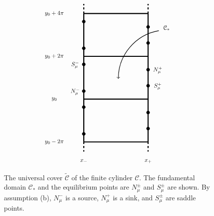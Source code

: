 \documentclass[11 pt]{article}
\renewcommand\({\left(}
\renewcommand\){\right)}
\newcommand\wt{\widetilde}
\newcommand\<{\langle}
\renewcommand\>{\rangle}
\newcommand\8{\infty}
\newcommand{\mc}{\mathcal}
\begin{document}
\begin{figure}[h]
\[
\begin{tikzpicture}[scale = 0.55]

\draw[ultra thick] (-3,-6) -- (-3, 6);
\draw[ultra thick] (3,-6) -- (3,6);

\draw[ultra thick, dashed] (-3,6) -- (-3,6.9);
\draw[ultra thick, dashed] (3,6) -- (3,6.9);
\draw[ultra thick, dashed] (-3,-6) -- (-3,-6.9);
\draw[ultra thick, dashed] (3,-6) -- (3,-6.9);

\draw[ultra thick] (-3,-2) -- (3,-2);
\draw[ultra thick] (-3,2) -- (3,2);
\draw[ultra thick] (-3,-6) -- (3,-6);
\draw[ultra thick] (-3,6) -- (3,6);


\node [scale = .50] [circle, draw, fill = black] at (-3,-1.25)  {};
\node [scale = .50] [circle, draw, fill = black] at (-3,1.25)  {};
\node [scale = .50] [circle, draw, fill = black] at (3,-.75)  {};
\node [scale = .50] [circle, draw, fill = black] at (3,.75)  {};

\node [scale = .50] [circle, draw, fill = black] at (-3,-5.25)  {};
\node [scale = .50] [circle, draw, fill = black] at (-3,-2.75)  {};
\node [scale = .50] [circle, draw, fill = black] at (3,-4.75)  {};
\node [scale = .50] [circle, draw, fill = black] at (3,-3.25)  {};

\node [scale = .50] [circle, draw, fill = black] at (-3,2.75)  {};
\node [scale = .50] [circle, draw, fill = black] at (-3,5.25)  {};
\node [scale = .50] [circle, draw, fill = black] at (3,3.25)  {};
\node [scale = .50] [circle, draw, fill = black] at (3,4.75)  {};

\draw (-3, -7.8) node [scale = .85] {$x_-$};
\draw (3, -7.8) node [scale = .85] {$x_+$};

\draw (-3.8,1.2) node [scale =.85] {$S^-_\mu$};
\draw (-3.8,-1.3) node [scale =.85] {$N^-_\mu$};
\draw (3.9,.70) node [scale =.85] {$N^+_\mu$};
\draw (3.9,-.80) node [scale =.85] {$S^+_\mu$};

\draw (-5.75,-2) node [scale =.85] {$y_0$};
\draw (-5.75,2) node [scale =.85] {$y_0 + 2\pi$};
\draw (-5.75,-6) node [scale =.85] {$y_0 - 2\pi$};
\draw (-5.75,6) node [scale =.85] {$y_0 + 4\pi$};


\draw [->] [thick] (4,4.4) arc [start angle=100, end angle=180, radius=130pt];
\draw (4.725,4.65) node [scale = 1]{\small{$\mc{C}_*$}};

\end{tikzpicture}
\]
\captionsetup{format=hang}
\caption{\small{The universal cover $\wt{\mc{C}}$ of the finite cylinder $\mc{C}$. The fundamental domain $\mc{C}_*$ and the equilibrium points are $N^{\pm}_\mu$ and $S^{\pm}_\mu$ are shown. By assumption (b), $N^-_\mu$ is a source, $N^+_\mu$ is a sink, and $S^{\pm}_\mu$ are saddle points. }}
\end{figure}
\end{document}

